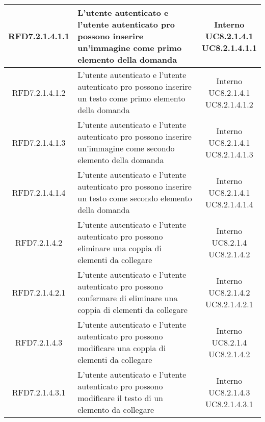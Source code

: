 \begin{longtable}{|c|>{\centering}m{7cm}|c|}
			 \hypertarget{{RFD7.2.1.4.1.1}}{{RFD7.2.1.4.1.1}} & L’utente autenticato e l'utente autenticato pro possono inserire un’immagine come primo elemento della domanda & \makecell{Interno\\ UC8.2.1.4.1 \\UC8.2.1.4.1.1 } \\ \hline
			 \hypertarget{{RFD7.2.1.4.1.2}}{{RFD7.2.1.4.1.2}} & L’utente autenticato e l'utente autenticato pro possono inserire un testo come primo elemento della domanda & \makecell{Interno\\ UC8.2.1.4.1 \\UC8.2.1.4.1.2 } \\ \hline
			 \hypertarget{{RFD7.2.1.4.1.3}}{{RFD7.2.1.4.1.3}} & L’utente autenticato e l'utente autenticato pro possono inserire un’immagine come secondo elemento della domanda  & \makecell{Interno\\ UC8.2.1.4.1 \\UC8.2.1.4.1.3 } \\ \hline
			 \hypertarget{{RFD7.2.1.4.1.4}}{{RFD7.2.1.4.1.4}} & L’utente autenticato e l'utente autenticato pro possono inserire un testo come secondo elemento della domanda  & \makecell{Interno\\ UC8.2.1.4.1 \\UC8.2.1.4.1.4 } \\ \hline
			 \hypertarget{{RFD7.2.1.4.2}}{{RFD7.2.1.4.2}} & L’utente autenticato e l'utente autenticato pro possono eliminare una coppia di elementi da collegare & \makecell{Interno\\ UC8.2.1.4 \\UC8.2.1.4.2 } \\ \hline
			 \hypertarget{{RFD7.2.1.4.2.1}}{{RFD7.2.1.4.2.1}} & L’utente autenticato e l'utente autenticato pro possono confermare di eliminare una coppia di elementi da collegare & \makecell{Interno\\ UC8.2.1.4.2 \\UC8.2.1.4.2.1 } \\ \hline
			 \hypertarget{{RFD7.2.1.4.3}}{{RFD7.2.1.4.3}} & L’utente autenticato e l'utente autenticato pro possono modificare una coppia di elementi da collegare 
 & \makecell{Interno\\ UC8.2.1.4 \\UC8.2.1.4.2 } \\ \hline
			 \hypertarget{{RFD7.2.1.4.3.1}}{{RFD7.2.1.4.3.1}} & L’utente autenticato e l'utente autenticato pro possono modificare il testo di un elemento da collegare & \makecell{Interno\\ UC8.2.1.4.3 \\UC8.2.1.4.3.1 } \\ \hline

\end{longtable}
